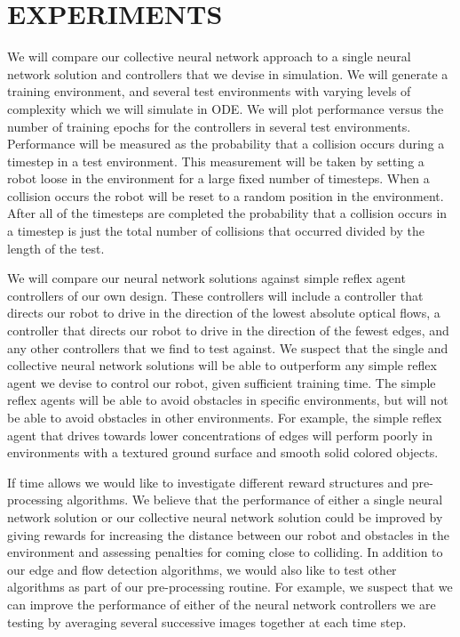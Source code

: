 \documentclass[letterpaper, 10 pt, conference]{ieeeconf}
\begin{document}
	\section*{EXPERIMENTS}

		We will compare our collective neural network approach to a single neural network solution and controllers that we devise in simulation.  We will generate a training environment, and several test environments with varying levels of complexity which we will simulate in ODE.  We will plot performance versus the number of training epochs for the controllers in several test environments.  Performance will be measured as the probability that a collision occurs during a timestep in a test environment.  This measurement will be taken by setting a robot loose in the environment for a large fixed number of timesteps.  When a collision occurs the robot will be reset to a random position in the environment.  After all of the timesteps are completed the probability that a collision occurs in a timestep is just the total number of collisions that occurred divided by the length of the test.

		We will compare our neural network solutions against simple reflex agent controllers of our own design.  These controllers will include a controller that directs our robot to drive in the direction of the lowest absolute optical flows, a controller that directs our robot to drive in the direction of the fewest edges, and any other controllers that we find to test against.  We suspect that the single and collective neural network solutions will be able to outperform any simple reflex agent we devise to control our robot, given sufficient training time.  The simple reflex agents will be able to avoid obstacles in specific environments, but will not be able to avoid obstacles in other environments.  For example, the simple reflex agent that drives towards lower concentrations of edges will perform poorly in environments with a textured ground surface and smooth solid colored objects.

		If time allows we would like to investigate different reward structures and pre-processing algorithms.  We believe that the performance of either a single neural network solution or our collective neural network solution could be improved by giving rewards for increasing the distance between our robot and obstacles in the environment and assessing penalties for coming close to colliding.  In addition to our edge and flow detection algorithms, we would also like to test other algorithms as part of our pre-processing routine.  For example, we suspect that we can improve the performance of either of the neural network controllers we are testing by averaging several successive images together at each time step.

	
	
\end{document}
